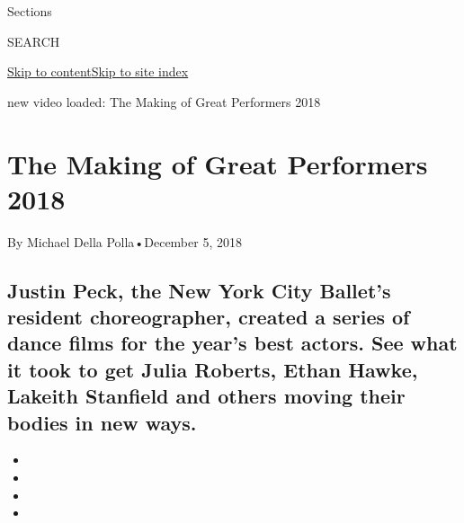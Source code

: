 Sections

SEARCH

\protect\hyperlink{site-content}{Skip to
content}\protect\hyperlink{site-index}{Skip to site index}

new video loaded: The Making of Great Performers 2018

\hypertarget{the-making-of-great-performers-2018}{%
\section{The Making of Great Performers
2018}\label{the-making-of-great-performers-2018}}

By Michael Della Polla•December 5, 2018

\hypertarget{justin-peck-the-new-york-city-ballets-resident-choreographer-created-a-series-of-dance-films-for-the-years-best-actors-see-what-it-took-to-get-julia-roberts-ethan-hawke-lakeith-stanfield-and-others-moving-their-bodies-in-new-ways}{%
\subsection{Justin Peck, the New York City Ballet's resident
choreographer, created a series of dance films for the year's best
actors. See what it took to get Julia Roberts, Ethan Hawke, Lakeith
Stanfield and others moving their bodies in new
ways.}\label{justin-peck-the-new-york-city-ballets-resident-choreographer-created-a-series-of-dance-films-for-the-years-best-actors-see-what-it-took-to-get-julia-roberts-ethan-hawke-lakeith-stanfield-and-others-moving-their-bodies-in-new-ways}}

\begin{itemize}
\item
\item
\item
\item
\end{itemize}

